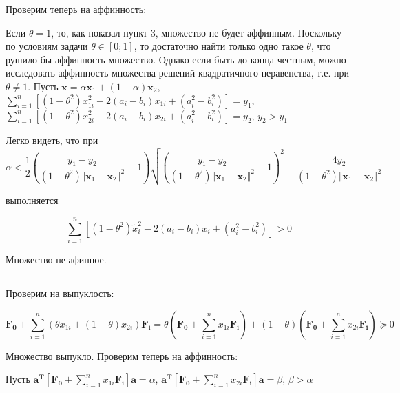 	Проверим теперь на аффинность:	
	
	Если $\theta = 1$, то, как показал пункт 3, множество не будет аффинным. Поскольку по условиям задачи $\theta \in \left[ 0;1 \right] $, то достаточно найти только одно такое $\theta$, что рушило бы аффинность множество. Однако если быть до конца честным, можно исследовать аффинность множества решений квадратичного неравенства, т.е. при $\theta \neq 1$. Пусть $\mathbf{x} = \alpha\mathbf{x}_1 + (1-\alpha)\mathbf{x}_2$, $\sum\limits_{i=1}^{n}\left[(1-\theta^2)x_{1i}^2 - 2(a_i-b_i)x_{1i} + (a_i^2-b_i^2) \right]  = y_1$, $\sum\limits_{i=1}^{n}\left[(1-\theta^2)x_{2i}^2 - 2(a_i-b_i)x_{2i} + (a_i^2-b_i^2) \right]  = y_2$, $y_2 > y_1$
	
	Легко видеть, что при 
	\begin{equation}
	\alpha < \frac12 \left(   \frac{y_1-y_2}{(1-\theta^2)\Vert \mathbf{x}_1 - \mathbf{x}_2 \Vert^2} - 1 \right)   \sqrt{\left( \frac{y_1-y_2}{(1-\theta^2)\Vert \mathbf{x}_1 - \mathbf{x}_2 \Vert^2} - 1\right)^2 -  \frac{4 y_2}{(1-\theta^2)\Vert \mathbf{x}_1 - \mathbf{x}_2 \Vert^2} }
	\end{equation}
	
	выполняется
	
	\begin{equation}
	\sum\limits_{i=1}^{n}\left[(1-\theta^2)\tilde{x}_i^2 - 2(a_i-b_i)\tilde{x}_i + (a_i^2-b_i^2) \right] > 0
	\end{equation}
	
	Множество не афинное.
	
	\subsection{}
	
	Проверим на выпуклость:
	
	\begin{equation}
	\mathbf{F_0} + \sum\limits_{i=1}^{n}(\theta x_{1i} + (1-\theta) x_{2i} )\mathbf{F_i} = \theta(\mathbf{F_0} + \sum\limits_{i=1}^{n} x_{1i}\mathbf{F_i}) + (1-\theta)(\mathbf{F_0} + \sum\limits_{i=1}^{n} x_{2i} \mathbf{F_i}) \succeq 0
	\end{equation}
	
	Множество выпукло. Проверим теперь на аффинность:
	
	Пусть  $\mathbf{a^T} \left[ \mathbf{F_0} + \sum\limits_{i=1}^{n} x_{1i} \mathbf{F_i}\right] \mathbf{a} = \alpha$, $\mathbf{a^T} \left[ \mathbf{F_0} + \sum\limits_{i=1}^{n} x_{2i} \mathbf{F_i}\right] \mathbf{a} = \beta$, $\beta > \alpha$
	
